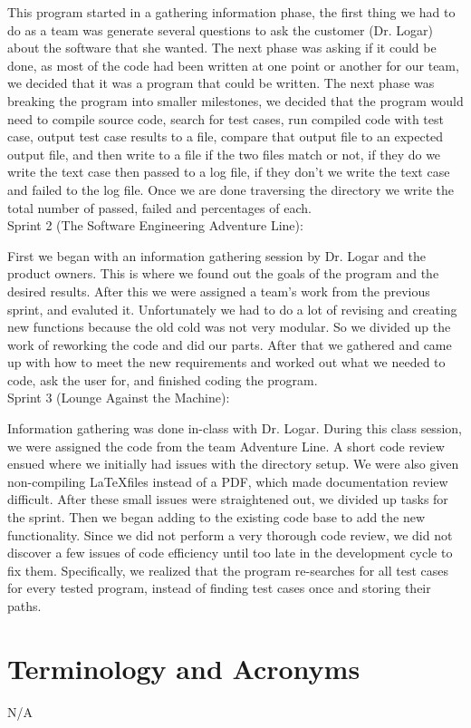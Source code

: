 This program started in a gathering information phase, the first thing we had to do as a team 
was generate several questions to ask the customer (Dr. Logar) about the software that she 
wanted.   The next phase was asking if it could be done, as most of the code had been written 
at one point or another for our team, we decided that it was a program that could be written.  
The next phase was breaking the program into smaller milestones, we decided that the program 
would need to compile source code, search for test cases, run compiled code with test case, 
output test case results to a file, compare that output file to an expected output file, and then 
write to a file if the two files match or not, if they do we write the text case then passed to a log 
file, if they don't we write the text case and failed to the log file.   Once we are done traversing the 
directory we write the total number of passed, failed and percentages of each. \\

Sprint 2 (The Software Engineering Adventure Line):

First we began with an information gathering session by Dr. Logar and the product owners. This is where we
found out the goals of the program and the desired results. After this we were assigned a team's work
from the previous sprint, and evaluted it. Unfortunately we had to do a lot of revising and creating new
functions because the old cold was not very modular. So we divided up the work of reworking the code and
did our parts. After that we gathered and came up with how to meet the new requirements and worked out
what we needed to code, ask the user for, and finished coding the program. \\

Sprint 3 (Lounge Against the Machine):

Information gathering was done in-class with Dr. Logar. During this class session, we were assigned the code from the team Adventure Line. A short code review ensued where we initially had issues with the directory setup. We were also given non-compiling \LaTeX files instead of a PDF, which made documentation review difficult. After these small issues were straightened out, we divided up tasks for the sprint. Then we began adding to the existing code base to add the new functionality. Since we did not perform a very thorough code review, we did not discover a few issues of code efficiency until too late in the development cycle to fix them. Specifically, we realized that the program re-searches for all test cases for every tested program, instead of finding test cases once and storing their paths. 

\section{Terminology and Acronyms}
N/A
